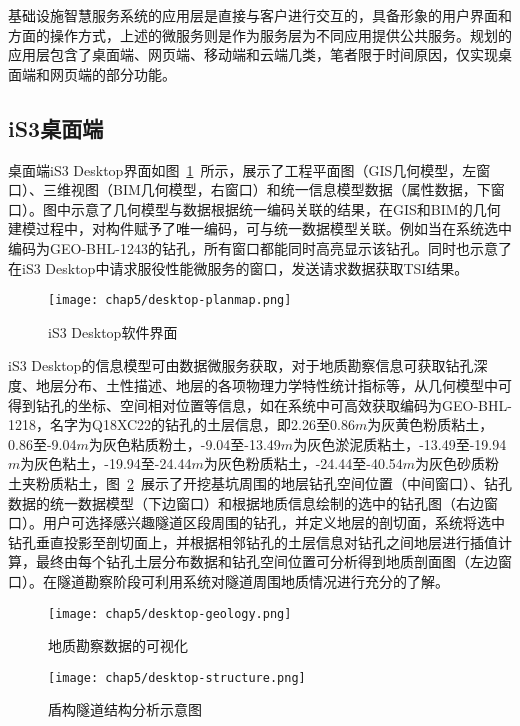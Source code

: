 基础设施智慧服务系统的应用层是直接与客户进行交互的，具备形象的用户界面和方面的操作方式，上述的微服务则是作为服务层为不同应用提供公共服务。规划的应用层包含了桌面端、网页端、移动端和云端几类，笔者限于时间原因，仅实现桌面端和网页端的部分功能。

\subsection{iS3桌面端}

桌面端iS3 Desktop界面如图~\ref{fig:iS3Desktop软件界面}~所示，展示了工程平面图（GIS几何模型，左窗口）、三维视图（BIM几何模型，右窗口）和统一信息模型数据（属性数据，下窗口）。图中示意了几何模型与数据根据统一编码关联的结果，在GIS和BIM的几何建模过程中，对构件赋予了唯一编码，可与统一数据模型关联。例如当在系统选中编码为GEO-BHL-1243的钻孔，所有窗口都能同时高亮显示该钻孔。同时也示意了在iS3 Desktop中请求服役性能微服务的窗口，发送请求数据获取TSI结果。

\begin{figure}[htb!]
    \centering
    \texttt{[image: chap5/desktop-planmap.png]}
    \caption{iS3 Desktop软件界面}
    \label{fig:iS3Desktop软件界面}
\end{figure}

iS3 Desktop的信息模型可由数据微服务获取，对于地质勘察信息可获取钻孔深度、地层分布、土性描述、地层的各项物理力学特性统计指标等，从几何模型中可得到钻孔的坐标、空间相对位置等信息，如在系统中可高效获取编码为GEO-BHL-1218，名字为Q18XC22的钻孔的土层信息，即2.26至0.86$m$为灰黄色粉质粘土，0.86至-9.04$m$为灰色粘质粉土，-9.04至-13.49$m$为灰色淤泥质粘土，-13.49至-19.94$m$为灰色粘土，-19.94至-24.44$m$为灰色粉质粘土，-24.44至-40.54$m$为灰色砂质粉土夹粉质粘土，图~\ref{fig:地质勘察数据的可视化}~展示了开挖基坑周围的地层钻孔空间位置（中间窗口）、钻孔数据的统一数据模型（下边窗口）和根据地质信息绘制的选中的钻孔图（右边窗口）。用户可选择感兴趣隧道区段周围的钻孔，并定义地层的剖切面，系统将选中钻孔垂直投影至剖切面上，并根据相邻钻孔的土层信息对钻孔之间地层进行插值计算，最终由每个钻孔土层分布数据和钻孔空间位置可分析得到地质剖面图（左边窗口）。在隧道勘察阶段可利用系统对隧道周围地质情况进行充分的了解。

\begin{figure}[htb!]
    \centering
    \texttt{[image: chap5/desktop-geology.png]}
    \caption{地质勘察数据的可视化}
    \label{fig:地质勘察数据的可视化}
\end{figure}

\begin{figure}[htb!]
    \centering
    \texttt{[image: chap5/desktop-structure.png]}
    \caption{盾构隧道结构分析示意图}
    \label{fig:盾构隧道结构分析示意图}
\end{figure}


